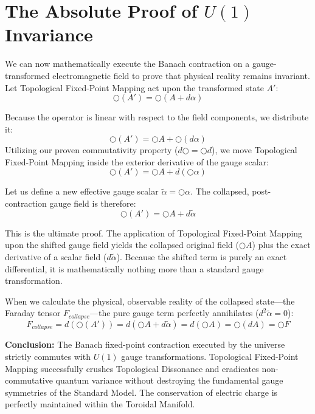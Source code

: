 \documentclass[12pt,openany]{book}
\theoremstyle{plain}
\theoremstyle{definition}
\theoremstyle{remark}
\begin{document}
\section{The Absolute Proof of $U(1)$ Invariance}

We can now mathematically execute the Banach contraction on a gauge-transformed electromagnetic field to prove that physical reality remains invariant. Let Topological Fixed-Point Mapping act upon the transformed state $A'$:
\begin{equation}
\bigcirc(A') = \bigcirc(A + d\alpha)
\end{equation}

Because the operator is linear with respect to the field components, we distribute it:
\begin{equation}
\bigcirc(A') = \bigcirc A + \bigcirc(d\alpha)
\end{equation}
Utilizing our proven commutativity property ($d\bigcirc = \bigcirc d$), we move Topological Fixed-Point Mapping inside the exterior derivative of the gauge scalar:
\begin{equation}
\bigcirc(A') = \bigcirc A + d(\bigcirc \alpha)
\end{equation}

Let us define a new effective gauge scalar $\tilde{\alpha} = \bigcirc \alpha$. The collapsed, post-contraction gauge field is therefore:
\begin{equation}
\bigcirc(A') = \bigcirc A + d\tilde{\alpha}
\end{equation}

This is the ultimate proof. The application of Topological Fixed-Point Mapping upon the shifted gauge field yields the collapsed original field ($\bigcirc A$) plus the exact derivative of a scalar field ($d\tilde{\alpha}$). Because the shifted term is purely an exact differential, it is mathematically nothing more than a standard gauge transformation.

When we calculate the physical, observable reality of the collapsed state—the Faraday tensor $F_{collapse}$—the pure gauge term perfectly annihilates ($d^2\tilde{\alpha} = 0$):
\begin{equation}
F_{collapse} = d(\bigcirc(A')) = d(\bigcirc A + d\tilde{\alpha}) = d(\bigcirc A) = \bigcirc(dA) = \bigcirc F
\end{equation}

\textbf{Conclusion:} The Banach fixed-point contraction executed by the universe strictly commutes with $U(1)$ gauge transformations. Topological Fixed-Point Mapping successfully crushes Topological Dissonance and eradicates non-commutative quantum variance without destroying the fundamental gauge symmetries of the Standard Model. The conservation of electric charge is perfectly maintained within the Toroidal Manifold.
\end{document}
